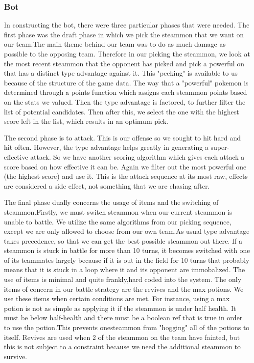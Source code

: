 \documentclass[10pt]{article}
\begin{document}
\subsubsection*{Bot}
In constructing the bot, there were three particular phases that were needed. The first phase was the draft phase in which we pick the steammon that we want on our team.The main theme behind our team was to do as much damage as possible to the opposing team. Therefore in our picking the steammon, we look at the most recent steammon that the opponent has picked and pick a powerful on that has a distinct type advantage against it. This "peeking" is available to us because of the structure of the game data. The way that a "powerful" pokemon is determined through a points function which assigns each steammon points based on the stats we valued. Then the type advantage is factored, to further filter the list of potential candidates. Then after this, we select the one with the highest score left in the list, which results in an optimum pick. 

The second phase is to attack. This is our offense so we sought to hit hard and hit often. However, the type advantage helps greatly in generating a super-effective attack. So we have another scoring algorithm which gives each attack a score based on how effective it can be. Again we filter out the most powerful one (the highest score) and use it. This is the attack sequence at its most raw, effects are considered a side effect, not something that we are chasing after.

The final phase dually concerns the usage of items and the switching of steammon.Firstly, we must switch steammon when our current steammon is unable to battle. We utilize the same algorithms from our picking sequence, except we are only allowed to choose from our own team.As usual type advantage takes precedence, so that we can get the best possible steammon out there. If a steammon is stuck in battle for more than 10 turns, it becomes switched with one of its teammates largely because if it is out in the field for 10 turns that probably means that it is stuck in a loop where it and its opponent are immobalized. The use of items is minimal and quite frankly,hard coded into the system. The only items of concern in our battle strategy are the revives and the max potions. We use these items when certain conditions are met. For instance, using a max potion is not as simple as applying it if the steammon is under half health. It must be below half-health and there must be a boolean ref that is true in order to use the potion.This prevents onesteammon from "hogging" all of the potions to itself. Revives are used when 2 of the steammon on the team have fainted, but this is not subject to a constraint because we need the additional steammon to survive.
    
\end{document}
